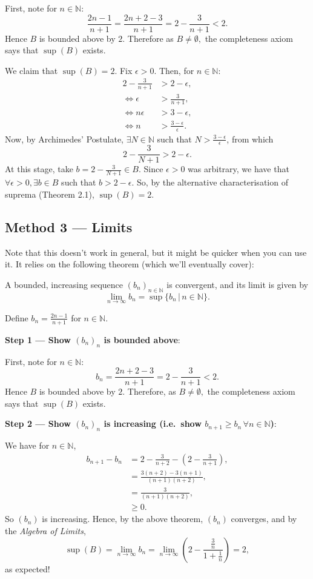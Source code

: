 \documentclass[
  17pt,
  a4paper]{extarticle}
\theoremstyle{plain}
\theoremstyle{definition}
\theoremstyle{plain}
\theoremstyle{plain}
\theoremstyle{plain}
\theoremstyle{plain}
\theoremstyle{definition}
\theoremstyle{definition}
\newtheorem*{Order Axioms*}{Order Axioms}\newtheorem{Order Axioms}{Order Axioms}[section]
\theoremstyle{remark}
\theoremstyle{remark}
\let\BeginKnitrBlock\begin \let\EndKnitrBlock\end
\renewcommand{\;}{\,}
\begin{document}
\BeginKnitrBlock{solution*}
First, note for \(n\in\mathbb{N}\): \[\frac{2n-1}{n+1} = \frac{2n+2-3}{n+1} = 2 - \frac{3}{n+1} < 2.\] Hence \(B\) is bounded above by \(2\). Therefore as \(B \neq \emptyset,\) the completeness axiom says that \(\sup(B)\) exists.

We claim that \(\sup(B) = 2.\) Fix \(\epsilon > 0.\) Then, for \(n \in \mathbb{N}:\)
\begin{align*}
2 - \frac{3}{n+1} &> 2-\epsilon,\\
\Leftrightarrow \epsilon &> \frac{3}{n+1},\\
\Leftrightarrow n\epsilon &> 3 - \epsilon,\\
\Leftrightarrow n &> \frac{3-\epsilon}{\epsilon}.
\end{align*}
Now, by Archimedes' Postulate, \(\exists N \in \mathbb{N}\) such that \(N > \frac{3-\epsilon}{\epsilon}\), from which \[2 - \frac{3}{N+1} > 2- \epsilon.\] At this stage, take \(b = 2 - \frac{3}{N+1} \in B\). Since \(\epsilon > 0\) was arbitrary, we have that \(\forall \epsilon > 0, \exists b \in B\) such that \(b > 2-\epsilon.\) So, by the alternative characterisation of suprema (Theorem 2.1), \(\sup(B) = 2.\)
\EndKnitrBlock{solution*}

\hypertarget{method-3-limits}{%
\subsection*{Method 3 --- Limits}\label{method-3-limits}}

Note that this doesn't work in general, but it might be quicker when you can use it. It relies on the following theorem (which we'll eventually cover):
\BeginKnitrBlock{theorem}
{\label{thm:unnamed-chunk-5} }A bounded, increasing sequence \((b_n)_{n \in \mathbb{N}}\) is convergent, and its limit is given by \[\lim_{n \to \infty} b_n = \sup\lbrace b_n \,\lvert\, n \in \mathbb{N} \rbrace.\]
\EndKnitrBlock{theorem}

\BeginKnitrBlock{solution*}
Define \(b_n = \frac{2n - 1}{n+1}\) for \(n \in \mathbb{N}\).

\textbf{Step 1 --- Show \((b_n)_n\) is bounded above}:

First, note for \(n\in\mathbb{N}\): \[b_n = \frac{2n+2-3}{n+1} = 2 - \frac{3}{n+1} < 2.\] Hence \(B\) is bounded above by \(2\). Therefore, as \(B \neq \emptyset,\) the completeness axiom says that \(\sup(B)\) exists.

\textbf{Step 2 --- Show \((b_n)_n\) is increasing (i.e.~show \(b_{n+1} \geq b_n \; \forall n \in \mathbb{N}\))}:

We have for \(n \in \mathbb{N}\),
\begin{align*}
b_{n+1} - b_{n} &= 2 - \frac{3}{n+2} - \left(2 - \frac{3}{n+1}\right),\\
&= \frac{3(n+2)-3(n+1)}{(n+1)(n+2)},\\
&= \frac{3}{(n+1)(n+2)},\\
&\geq 0.
\end{align*}
So \((b_n)\) is increasing. Hence, by the above theorem, \((b_n)\) converges, and by the \emph{Algebra of Limits}, \[\sup(B) = \lim_{n \to \infty} b_n = \lim_{n \to \infty} \left(2 - \frac{\frac{3}{n}}{1 + \frac{1}{n}}\right) = 2,\]
as expected!
\EndKnitrBlock{solution*}
\end{document}
